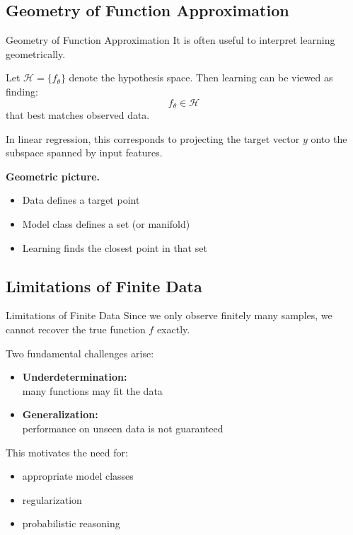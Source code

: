 \documentclass[aspectratio=169,11pt]{beamer}
\begin{document}
\subsection{Geometry of Function Approximation}
\begin{frame}[t,allowframebreaks]{Geometry of Function Approximation}
\small
It is often useful to interpret learning geometrically.

Let $\mathcal{H} = \{f_\theta\}$ denote the hypothesis space. Then learning can be viewed as finding:
\[
f_\theta \in \mathcal{H}
\]
that best matches observed data.

In linear regression, this corresponds to projecting the target vector $y$ onto the subspace spanned by input features.

\textbf{Geometric picture.}\\ \begin{itemize}
    \item Data defines a target point
    \item Model class defines a set (or manifold)
    \item Learning finds the closest point in that set
\end{itemize}
\end{frame}

\subsection{Limitations of Finite Data}
\begin{frame}[t,allowframebreaks]{Limitations of Finite Data}
\small
Since we only observe finitely many samples, we cannot recover the true function $f$ exactly.

Two fundamental challenges arise:
\begin{itemize}
    \item \textbf{Underdetermination:}\\ many functions may fit the data
    \item \textbf{Generalization:}\\ performance on unseen data is not guaranteed
\end{itemize}

This motivates the need for:
\begin{itemize}
    \item appropriate model classes
    \item regularization
    \item probabilistic reasoning
\end{itemize}
\end{frame}
\end{document}
